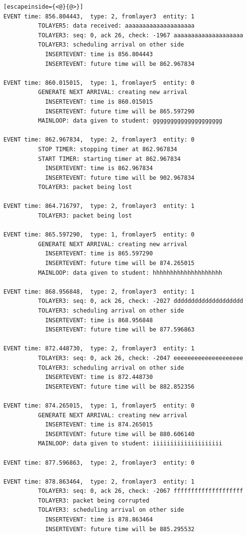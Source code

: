 \documentclass[paper=a4, fontsize=11pt]{scrartcl}
\numberwithin{equation}{section}		%
\numberwithin{figure}{section}			%
\numberwithin{table}{section}				%
\begin{document}
\begin{lstlisting}[escapeinside={<@}{@>}]
EVENT time: 856.804443,  type: 2, fromlayer3  entity: 1
          TOLAYER5: data received: aaaaaaaaaaaaaaaaaaaa
          TOLAYER3: seq: 0, ack 26, check: -1967 aaaaaaaaaaaaaaaaaaaa
          TOLAYER3: scheduling arrival on other side
            INSERTEVENT: time is 856.804443
            INSERTEVENT: future time will be 862.967834

EVENT time: 860.015015,  type: 1, fromlayer5  entity: 0
          GENERATE NEXT ARRIVAL: creating new arrival
            INSERTEVENT: time is 860.015015
            INSERTEVENT: future time will be 865.597290
          MAINLOOP: data given to student: gggggggggggggggggggg

EVENT time: 862.967834,  type: 2, fromlayer3  entity: 0
          STOP TIMER: stopping timer at 862.967834
          START TIMER: starting timer at 862.967834
            INSERTEVENT: time is 862.967834
            INSERTEVENT: future time will be 902.967834
          TOLAYER3: packet being lost

EVENT time: 864.716797,  type: 2, fromlayer3  entity: 1
          TOLAYER3: packet being lost

EVENT time: 865.597290,  type: 1, fromlayer5  entity: 0
          GENERATE NEXT ARRIVAL: creating new arrival
            INSERTEVENT: time is 865.597290
            INSERTEVENT: future time will be 874.265015
          MAINLOOP: data given to student: hhhhhhhhhhhhhhhhhhhh

EVENT time: 868.956848,  type: 2, fromlayer3  entity: 1
          TOLAYER3: seq: 0, ack 26, check: -2027 dddddddddddddddddddd
          TOLAYER3: scheduling arrival on other side
            INSERTEVENT: time is 868.956848
            INSERTEVENT: future time will be 877.596863

EVENT time: 872.448730,  type: 2, fromlayer3  entity: 1
          TOLAYER3: seq: 0, ack 26, check: -2047 eeeeeeeeeeeeeeeeeeee
          TOLAYER3: scheduling arrival on other side
            INSERTEVENT: time is 872.448730
            INSERTEVENT: future time will be 882.852356

EVENT time: 874.265015,  type: 1, fromlayer5  entity: 0
          GENERATE NEXT ARRIVAL: creating new arrival
            INSERTEVENT: time is 874.265015
            INSERTEVENT: future time will be 880.606140
          MAINLOOP: data given to student: iiiiiiiiiiiiiiiiiiii

EVENT time: 877.596863,  type: 2, fromlayer3  entity: 0

EVENT time: 878.863464,  type: 2, fromlayer3  entity: 1
          TOLAYER3: seq: 0, ack 26, check: -2067 ffffffffffffffffffff
          TOLAYER3: packet being corrupted
          TOLAYER3: scheduling arrival on other side
            INSERTEVENT: time is 878.863464
            INSERTEVENT: future time will be 885.295532


\end{lstlisting}
\end{document}
